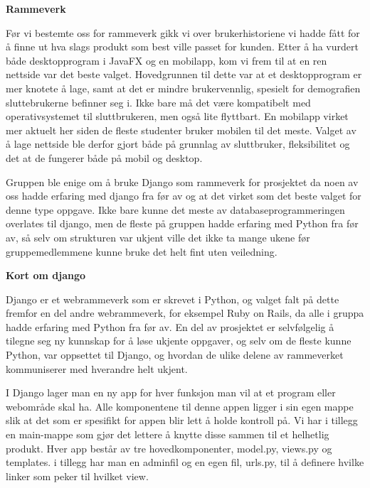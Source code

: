 \documentclass[12pt,a4paper,norsk]{article}
\begin{document}
\bigskip \noindent \textbf{Rammeverk}
\par Før vi bestemte oss for rammeverk gikk vi over brukerhistoriene vi hadde fått for å finne ut hva slags produkt som best ville passet for kunden. Etter å ha vurdert både desktopprogram i JavaFX og en mobilapp, kom vi frem til at en ren nettside var det beste valget. Hovedgrunnen til dette var at et desktopprogram er mer knotete å lage, samt at det er mindre brukervennlig, spesielt for demografien sluttebrukerne befinner seg i. Ikke bare må det være kompatibelt med operativsystemet til sluttbrukeren, men også lite flyttbart. En mobilapp virket mer aktuelt her siden de fleste studenter bruker mobilen til det meste. Valget av å lage nettside ble derfor gjort både på grunnlag av sluttbruker, fleksibilitet og det at de fungerer både på mobil og desktop.

Gruppen ble enige om å bruke Django som rammeverk for prosjektet da noen av oss hadde erfaring med django fra før av og at det virket som det beste valget for denne type oppgave. Ikke bare kunne det meste av databaseprogrammeringen overlates til django, men de fleste på gruppen hadde erfaring med Python fra før av, så selv om strukturen var ukjent ville det ikke ta mange ukene før gruppemedlemmene kunne bruke det helt fint uten veiledning.

\bigskip \noindent \textbf{Kort om django}
\par Django er et webrammeverk som er skrevet i Python, og valget falt på dette fremfor en del andre webrammeverk, for eksempel Ruby on Rails, da alle i gruppa hadde erfaring med Python fra før av. En del av prosjektet er selvfølgelig å tilegne seg ny kunnskap for å løse ukjente oppgaver, og selv om de fleste kunne Python, var oppsettet til Django, og hvordan de ulike delene av rammeverket kommuniserer med hverandre helt ukjent.

I Django lager man en ny app for hver funksjon man vil at et program eller webområde skal ha. Alle komponentene til denne appen ligger i sin egen mappe slik at det som er spesifikt for appen blir lett å holde kontroll på. Vi har i tillegg en main-mappe som gjør det lettere å knytte disse sammen til et helhetlig produkt. Hver app består av tre hovedkomponenter, model.py, views.py og templates. i tillegg har man en adminfil og en egen fil, urls.py, til å definere hvilke linker som peker til hvilket view.
\end{document}
